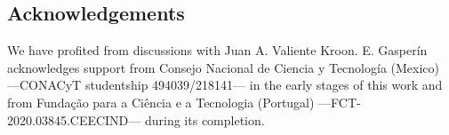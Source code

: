 \documentclass[10pt,a4paper]{article}
\theoremstyle{plain}
\begin{document}
\subsection*{Acknowledgements}

We have profited from discussions with Juan A. Valiente Kroon.
E. Gasper\'in acknowledges support from Consejo Nacional de
Ciencia y Tecnolog\'ia (Mexico) ---CONACyT studentship
494039/218141--- in the early stages of this work and from Fundaç\~ao
para a Ci\^encia e a Tecnologia (Portugal) ---FCT-2020.03845.CEECIND---
during its completion.

% 


%








\end{document}
